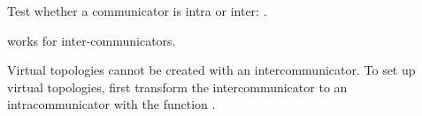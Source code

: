 Test whether a communicator is intra or inter:
.

 works for inter-communicators.


Virtual topologies cannot be created with an intercommunicator. To set
up virtual topologies, first transform the intercommunicator to an
intracommunicator with the function
.

